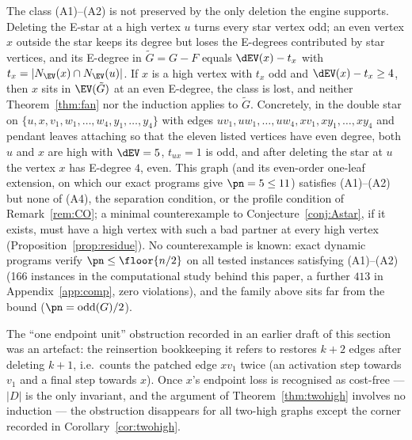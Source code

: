 \begin{remark}\label{rem:gap}
The class {\rm(A1)--(A2)} is not preserved by the only deletion the engine
supports. Deleting the E-star at a high vertex $u$ turns every star vertex odd;
an even vertex $x$ outside the star keeps its degree but loses the E-degrees
contributed by star vertices, and its E-degree in $\tilde G=G-F$ equals
$\dEV(x)-t_x$ with $t_x=|N_{\EV}(x)\cap N_{\EV}(u)|$. If $x$ is a high vertex
with $t_x$ odd and $\dEV(x)-t_x\ge 4$, then $x$ sits in $\EV(\tilde G)$ at an
even E-degree, the class is lost, and neither Theorem~\ref{thm:fan} nor the
induction applies to $\tilde G$. Concretely, in the double star on
$\{u,x,v_1,w_1,\dots,w_4,y_1,\dots,y_4\}$ with edges
$uv_1,uw_1,\dots,uw_4,xv_1,xy_1,\dots,xy_4$ and pendant leaves attaching so
that the eleven listed vertices have even degree, both $u$ and $x$ are high
with $\dEV=5$, $t_{ux}=1$ is odd, and after deleting the star at $u$ the vertex
$x$ has E-degree $4$, even. This graph (and its even-order one-leaf extension,
on which our exact programs give $\pn=5\le 11$) satisfies {\rm(A1)--(A2)} but
none of {\rm(A4)}, the separation condition, or the profile condition of
Remark~\ref{rem:CO}; a minimal counterexample to
Conjecture~\ref{conj:Astar}, if it exists, must have a high vertex with such a
bad partner at {\rm every} high vertex (Proposition~\ref{prop:residue}).
No counterexample is known: exact dynamic programs verify
$\pn\le\floor{n/2}$ on all tested instances satisfying {\rm(A1)--(A2)} (166
instances in the computational study behind this paper, a further $413$ in
Appendix~\ref{app:comp}, zero violations), and the family above sits far from
the bound ($\pn=\mathrm{odd}(G)/2$).

The ``one endpoint unit'' obstruction recorded in an earlier draft of this section was an
artefact: the reinsertion bookkeeping it refers to restores $k+2$ edges after deleting $k+1$,
i.e.\ counts the patched edge $xv_1$ twice (an activation step towards $v_1$ and a final step
towards $x$). Once $x$'s endpoint loss is recognised as cost-free --- $|D|$ is the only
invariant, and the argument of Theorem~\ref{thm:twohigh} involves no induction --- the
obstruction disappears for all two-high graphs except the corner recorded in
Corollary~\ref{cor:twohigh}.


\end{remark}

